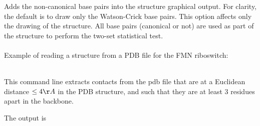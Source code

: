 \subsubsection{} Adds the non-canonical base pairs into the structure graphical output. For clarity, the default is to draw only the Watson-Crick base pairs.
This option affects only the drawing of the structure. All base pairs (canonical or not) are used as part of the structure to perform the two-set statistical test.
\\\\

\noindent
Example of reading a structure from a PDB file for the FMN riboswitch:

\\

\noindent
This command line extracts contacts from the pdb file that are at a
Euclidean distance $\leq 4 \AA$ in the PDB structure, and such that
they are at least 3 residues apart in the backbone.


\noindent
The output is


